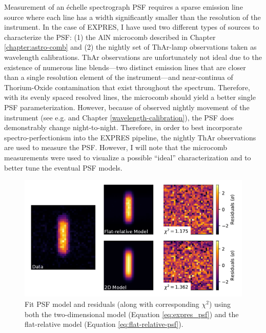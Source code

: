 Measurement of an \'{e}chelle spectrograph PSF requires a sparse emission line source where each line has a width significantly smaller than the resolution of the instrument. In the case of EXPRES, I have used two different types of sources to characterize the PSF: (1) the AlN microcomb described in Chapter \ref{chapter:astro-comb} and (2) the nightly set of ThAr-lamp observations taken as wavelength calibrations. ThAr observations are unfortunately not ideal due to the existence of numerous line blends---two distinct emission lines that are closer than a single resolution element of the instrument---and near-continua of Thorium-Oxide contamination that exist throughout the spectrum. Therefore, with its evenly spaced resolved lines, the microcomb should yield a better single PSF parameterization. However, because of observed nightly movement of the instrument (see e.g. \citet{blackman_performance_2020} and Chapter \ref{wavelength-calibration}), the PSF does demonstrably change night-to-night. Therefore, in order to best incorporate spectro-perfectionism into the EXPRES pipeline, the nightly ThAr observations are used to measure the PSF. However, I will note that the microcomb measurements were used to visualize a possible ``ideal'' characterization and to better tune the eventual PSF models.

\begin{figure}
    \centering
    \includegraphics[width=\textwidth]{figures-5/expres-psf.pdf}
    \caption[EXPRES point spread function model]{Fit PSF model and residuals (along with corresponding $\chi^2$) using both the two-dimensional model (Equation \ref{eq:expres_psf}) and the flat-relative model (Equation \ref{eq:flat-relative-psf}).}
    \label{fig:psf-resid}
\end{figure}

